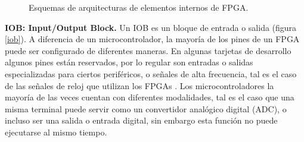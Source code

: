 \documentclass[twoside,spanish,ESP,MSc]{plantillaLabUPV}
\theoremstyle{definition}
\newcommand{\f}{FPGA }
\newcommand{\fs}{FPGAs }
\begin{document}
\begin{figure}
	 \hspace{5mm}
	\caption{Esquemas de arquitecturas de elementos internos de FPGA.}
	\label{efepe}
\end{figure}


\checkmark\textbf{IOB: Input/Output Block.} Un IOB es un bloque de entrada o salida (figura \ref{iob}). A diferencia de un microcontrolador, la mayoría de los pines de un \f puede ser configurado de diferentes maneras. En algunas tarjetas de desarrollo algunos pines están reservados, por lo regular son entradas o salidas especializadas para ciertos periféricos, o señales de alta frecuencia, tal es el caso de las señales de reloj que utilizan los \fs. Los microcontroladores la mayoría de las veces cuentan con diferentes modalidades, tal es el caso que una misma terminal puede servir como un convertidor analógico digital (ADC), o incluso ser una salida o entrada digital, sin embargo esta función no puede ejecutarse al mismo tiempo.
\end{document}
